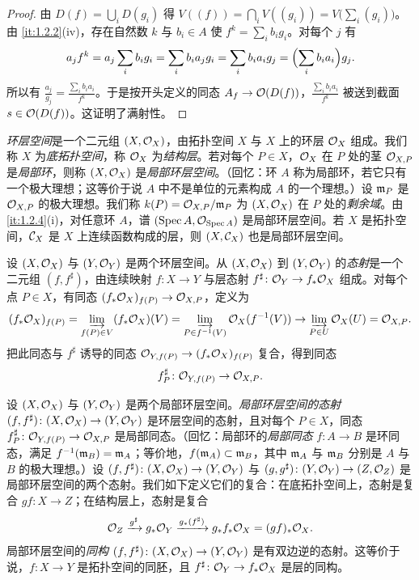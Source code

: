 \begin{proof}
由 $D(f)=\bigcup_iD(g_i)$ 得 $V((f))=\bigcap_iV((g_i))=V\bigl(\sum_i(g_i)\bigr)$。由 \ref{it:1.2.2}(iv)，存在自然数 $k$ 与 $b_i\in A$ 使 $f^k=\sum_ib_ig_i$。对每个 $j$ 有
\[
a_jf^k=a_j\sum_ib_ig_i=\sum_ib_ia_jg_i=\sum_ib_ia_ig_j=\Bigl(\sum_ib_ia_i\Bigr)g_j.
\]
所以有 $\frac{a_j}{g_j}=\frac{\sum_ib_ia_i}{f^k}$。于是按开头定义的同态 $A_f\to\mathcal{O}(D(f))$，$\frac{\sum_ib_ia_i}{f^k}$ 被送到截面 $s\in\mathcal{O}(D(f))$。这证明了满射性。
\end{proof}

\emph{环层空间}是一个二元组 $(X,\mathcal{O}_X)$，由拓扑空间 $X$ 与 $X$ 上的环层 $\mathcal{O}_X$ 组成。我们称 $X$ 为\emph{底拓扑空间}，称 $\mathcal{O}_X$ 为\emph{结构层}。若对每个 $P\in X$，$\mathcal{O}_X$ 在 $P$ 处的茎 $\mathcal{O}_{X,P}$ 是\emph{局部环}，则称 $(X,\mathcal{O}_X)$ 是\emph{局部环层空间}。（回忆：环 $A$ 称为局部环，若它只有一个极大理想；这等价于说 $A$ 中不是单位的元素构成 $A$ 的一个理想。）设 $\mathfrak{m}_P$ 是 $\mathcal{O}_{X,P}$ 的极大理想。我们称 $k(P)=\mathcal{O}_{X,P}/\mathfrak{m}_P$ 为 $(X,\mathcal{O}_X)$ 在 $P$ 处的\emph{剩余域}。由 \ref{it:1.2.4}(i)，对任意环 $A$，谱 $(\operatorname{Spec} A,\mathcal{O}_{\operatorname{Spec} A})$ 是局部环层空间。若 $X$ 是拓扑空间，$\mathcal{C}_X$ 是 $X$ 上连续函数构成的层，则 $(X,\mathcal{C}_X)$ 也是局部环层空间。

设 $(X,\mathcal{O}_X)$ 与 $(Y,\mathcal{O}_Y)$ 是两个环层空间。从 $(X,\mathcal{O}_X)$ 到 $(Y,\mathcal{O}_Y)$ 的\emph{态射}是一个二元组 $(f,f^\sharp)$，由连续映射 $f\colon X\to Y$ 与层态射 $f^\sharp\colon\mathcal{O}_Y\to f_*\mathcal{O}_X$ 组成。对每个点 $P\in X$，有同态 $(f_*\mathcal{O}_X)_{f(P)}\to\mathcal{O}_{X,P}$，定义为
\[
(f_*\mathcal{O}_X)_{f(P)}=\varinjlim_{f(P)\in V}(f_*\mathcal{O}_X)(V)=\varinjlim_{P\in f^{-1}(V)}\mathcal{O}_X(f^{-1}(V))\to\varinjlim_{P\in U}\mathcal{O}_X(U)=\mathcal{O}_{X,P}.
\]
把此同态与 $f^\sharp$ 诱导的同态 $\mathcal{O}_{Y,f(P)}\to(f_*\mathcal{O}_X)_{f(P)}$ 复合，得到同态
\[
f^\sharp_P\colon \mathcal{O}_{Y,f(P)}\to\mathcal{O}_{X,P}.
\]

设 $(X,\mathcal{O}_X)$ 与 $(Y,\mathcal{O}_Y)$ 是两个局部环层空间。\emph{局部环层空间的态射} $(f,f^\sharp)\colon(X,\mathcal{O}_X)\to(Y,\mathcal{O}_Y)$ 是环层空间的态射，且对每个 $P\in X$，同态 $f^\sharp_P\colon\mathcal{O}_{Y,f(P)}\to\mathcal{O}_{X,P}$ 是局部同态。（回忆：局部环的\emph{局部同态} $f\colon A\to B$ 是环同态，满足 $f^{-1}(\mathfrak{m}_B)=\mathfrak{m}_A$；等价地，$f(\mathfrak{m}_A)\subset\mathfrak{m}_B$，其中 $\mathfrak{m}_A$ 与 $\mathfrak{m}_B$ 分别是 $A$ 与 $B$ 的极大理想。）设 $(f,f^\sharp)\colon(X,\mathcal{O}_X)\to(Y,\mathcal{O}_Y)$ 与 $(g,g^\sharp)\colon(Y,\mathcal{O}_Y)\to(Z,\mathcal{O}_Z)$ 是局部环层空间的两个态射。我们如下定义它们的复合：在底拓扑空间上，态射是复合 $gf\colon X\to Z$；在结构层上，态射是复合
\[
\mathcal{O}_Z\xrightarrow{g^\sharp}g_*\mathcal{O}_Y\xrightarrow{g_*(f^\sharp)}g_*f_*\mathcal{O}_X=(gf)_*\mathcal{O}_X.
\]
局部环层空间的\emph{同构} $(f,f^\sharp)\colon(X,\mathcal{O}_X)\to(Y,\mathcal{O}_Y)$ 是有双边逆的态射。这等价于说，$f\colon X\to Y$ 是拓扑空间的同胚，且 $f^\sharp\colon\mathcal{O}_Y\to f_*\mathcal{O}_X$ 是层的同构。

